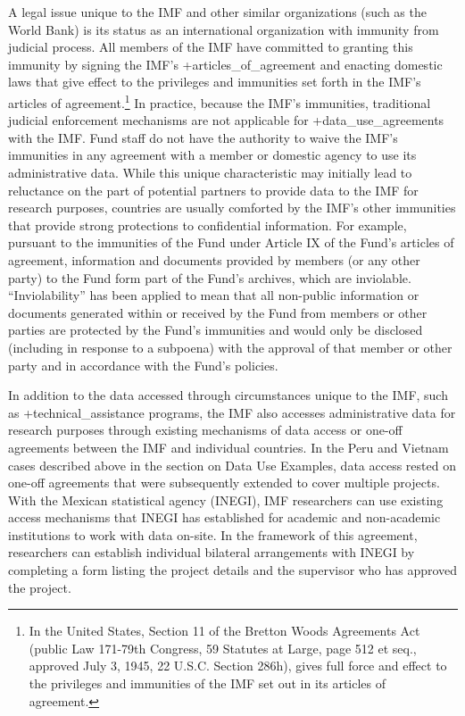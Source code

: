 \documentclass[
]{WileySix}
\begin{document}
A legal issue unique to the IMF and other similar organizations (such as the World Bank) is its status as an international organization with immunity from judicial process. All members of the IMF have committed to granting this immunity by signing the IMF's +articles\_of\_agreement\textbar{} and enacting domestic laws that give effect to the privileges and immunities set forth in the IMF's articles of agreement.\footnote{In the United States, Section 11 of the Bretton Woods Agreements Act (public Law 171-79th Congress, 59 Statutes at Large, page 512 et seq., approved July 3, 1945, 22 U.S.C. Section 286h), gives full force and effect to the privileges and immunities of the IMF set out in its articles of agreement.} In practice, because the IMF's immunities, traditional judicial enforcement mechanisms are not applicable for +data\_use\_agreements\textbar{} with the IMF. Fund staff do not have the authority to waive the IMF's immunities in any agreement with a member or domestic agency to use its administrative data. While this unique characteristic may initially lead to reluctance on the part of potential partners to provide data to the IMF for research purposes, countries are usually comforted by the IMF's other immunities that provide strong protections to confidential information. For example, pursuant to the immunities of the Fund under Article IX of the Fund's articles of agreement, information and documents provided by members (or any other party) to the Fund form part of the Fund's archives, which are inviolable. ``Inviolability'' has been applied to mean that all non-public information or documents generated within or received by the Fund from members or other parties are protected by the Fund's immunities and would only be disclosed (including in response to a subpoena) with the approval of that member or other party and in accordance with the Fund's policies.

In addition to the data accessed through circumstances unique to the IMF, such as +technical\_assistance\textbar{} programs, the IMF also accesses administrative data for research purposes through existing mechanisms of data access or one-off agreements between the IMF and individual countries. In the Peru and Vietnam cases described above in the section on Data Use Examples, data access rested on one-off agreements that were subsequently extended to cover multiple projects. With the Mexican statistical agency (INEGI), IMF researchers can use existing access mechanisms that INEGI has established for academic and non-academic institutions to work with data on-site. In the framework of this agreement, researchers can establish individual bilateral arrangements with INEGI by completing a form listing the project details and the supervisor who has approved the project.
\end{document}

